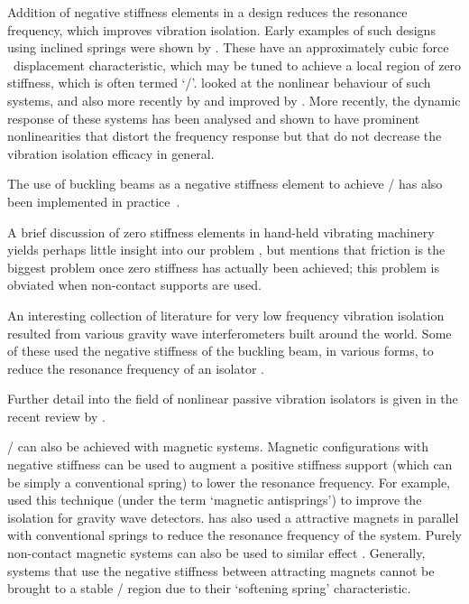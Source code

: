 Addition of negative stiffness elements in a design reduces the resonance frequency, which improves vibration isolation.
Early examples of such designs using inclined springs were shown by \textcite{molyneux1957}.
These have an approximately cubic force \vs\ displacement characteristic, which may be tuned to achieve a local region of zero stiffness, which is often termed `\qzs/'.
\textcite{alabuzhev1989} looked at the nonlinear behaviour of such
systems, and also more recently by
\textcite{carrella2006,carrella2007,carrella2008,carrella2009} and improved by
\textcite{kovacic2008}.
More recently, the dynamic response of these systems has been analysed \parencite{carrella2009,carrella2008thesis} and shown to have prominent nonlinearities that distort the frequency response but that do not decrease the vibration isolation efficacy in general.

The use of buckling beams as a negative stiffness element to achieve \qzs/ has also been implemented in practice~\cite{platus1999,tarnai2003,lee2007}.

A brief discussion of zero stiffness elements in hand-held vibrating machinery yields perhaps little insight into our problem \cite{sokolov2007}, but mentions that friction is the biggest problem once zero stiffness has actually been achieved; this problem is obviated when non-contact supports are used.

An interesting collection of literature for very low frequency vibration isolation resulted from various gravity wave interferometers built around the world.
Some of these used the negative stiffness of the buckling beam, in various forms, to reduce the resonance frequency of an isolator \cite{cella2005}.

Further detail into the field  of nonlinear passive vibration isolators is given in the recent review by \textcite{ibrahim2008}.

\QZS/ can also be achieved with magnetic systems.
Magnetic configurations with negative stiffness can be used to augment a positive stiffness support (which can be simply a conventional spring) to lower the resonance frequency.
For example, \textcite{beccaria1997} used this technique (under the term `magnetic antisprings') to improve the isolation for gravity wave detectors.
\textcite{carrella2007a,carrella2008} has also used a attractive magnets in parallel with conventional springs to reduce the resonance frequency of the system.
Purely non-contact magnetic systems can also be used to similar effect \cite{robertson2006,robertson2007}.
Generally, systems that use the negative stiffness between attracting magnets cannot be brought to a stable \qzs/ region due to their `softening spring' characteristic.

